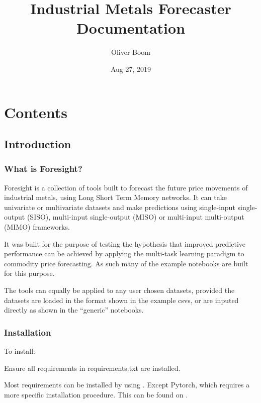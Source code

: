 \documentclass[letterpaper,10pt,english]{sphinxmanual}
\title{Industrial Metals Forecaster Documentation}
\date{Aug 27, 2019}
\author{Oliver Boom}
\begin{document}
\pagestyle{empty}
\sphinxmaketitle
\pagestyle{plain}
\sphinxtableofcontents
\pagestyle{normal}
\label{\detokenize{index::doc}}



\chapter{Contents}
\label{\detokenize{index:contents}}

\section{Introduction}
\label{\detokenize{intro:introduction}}\label{\detokenize{intro::doc}}

\subsection{What is Foresight?}
\label{\detokenize{intro:what-is-foresight}}
Foresight is a collection of tools built to forecast the future price movements of industrial metals, using Long Short Term Memory networks. It can take univariate or multivariate datasets and make predictions using single-input single-output (SISO), multi-input single-output (MISO) or multi-input multi-output (MIMO) frameworks.

It was built for the purpose of testing the hypothesis that improved predictive performance can be achieved by applying the multi-task learning paradigm to commodity price forecasting. As such many of the example notebooks are built for this purpose.

The tools can equally be applied to any user chosen datasets, provided the datasets are loaded in the format shown in the example csvs, or are inputed directly as shown in the “generic” notebooks.


\subsection{Installation}
\label{\detokenize{intro:installation}}
To install:

\begin{sphinxVerbatim}[commandchars=\\\{\}]
  
\end{sphinxVerbatim}

Ensure all requirements in requirements.txt are installed.

Most requirements can be installed by using  .
Except Pytorch, which requires a more specific installation procedure. This can be found on .
\end{document}
